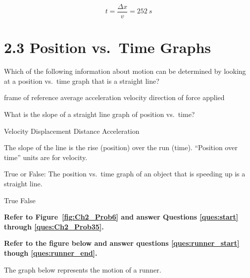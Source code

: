 \documentclass[addpoints]{exam}
\begin{document}
\begin{questions}
\begin{solution}
\begin{equation*}
    t = \frac{\Delta{x}}{v} = \SI{252}{s}
\end{equation*}
\end{solution}


\section*{2.3 Position vs.~Time Graphs}

\question
Which of the following information about motion can be determined by looking at a position vs.~time graph that is a straight line?

\begin{choices}
\choice frame of reference
\choice average acceleration
\CorrectChoice velocity
\choice direction of force applied
\end{choices}

\question
What is the slope of a straight line graph of position vs.~time?

\begin{choices}
\CorrectChoice Velocity
\choice Displacement
\choice Distance
\choice Acceleration
\end{choices}

\begin{solution}
The slope of the line is the rise (position) over the run (time). ``Position over time'' units are for velocity.
\end{solution}


\question
True or False: The position vs.~time graph of an object that is speeding up is a straight line.

\begin{choices}
\choice True
\CorrectChoice False
\end{choices}



\begin{EnvUplevel}
\textbf{Refer to Figure~\ref{fig:Ch2_Prob6} and answer Questions \ref{ques:start} through \ref{ques:Ch2_Prob35}.}
\end{EnvUplevel}



\begin{EnvUplevel}
\textbf{Refer to the figure below and answer questions \ref{ques:runner_start} though \ref{ques:runner_end}.}

The graph below represents the motion of a runner.
\end{EnvUplevel}


\end{questions}
\end{document}
